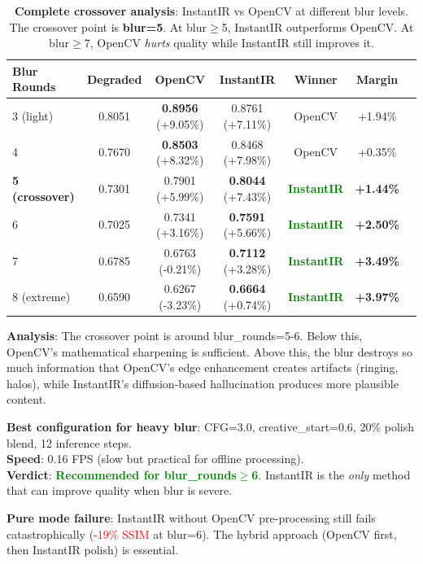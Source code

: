 \documentclass[11pt,a4paper]{article}
\begin{document}
\begin{table}[h]
\centering
\begin{tabular}{lcccccc}
\toprule
\textbf{Blur Rounds} & \textbf{Degraded} & \textbf{OpenCV} & \textbf{InstantIR} & \textbf{Winner} & \textbf{Margin} \\
\midrule
3 (light) & 0.8051 & \textbf{0.8956} (+9.05\%) & 0.8761 (+7.11\%) & OpenCV & +1.94\% \\
4 & 0.7670 & \textbf{0.8503} (+8.32\%) & 0.8468 (+7.98\%) & OpenCV & +0.35\% \\
\midrule
\textbf{5 (crossover)} & 0.7301 & 0.7901 (+5.99\%) & \textbf{0.8044} (+7.43\%) & \textcolor{green}{\textbf{InstantIR}} & \textbf{+1.44\%} \\
6 & 0.7025 & 0.7341 (+3.16\%) & \textbf{0.7591} (+5.66\%) & \textcolor{green}{\textbf{InstantIR}} & \textbf{+2.50\%} \\
7 & 0.6785 & 0.6763 (-0.21\%) & \textbf{0.7112} (+3.28\%) & \textcolor{green}{\textbf{InstantIR}} & \textbf{+3.49\%} \\
8 (extreme) & 0.6590 & 0.6267 (-3.23\%) & \textbf{0.6664} (+0.74\%) & \textcolor{green}{\textbf{InstantIR}} & \textbf{+3.97\%} \\
\bottomrule
\end{tabular}
\caption{\textbf{Complete crossover analysis}: InstantIR vs OpenCV at different blur levels. The crossover point is \textbf{blur=5}. At blur$\geq$5, InstantIR outperforms OpenCV. At blur$\geq$7, OpenCV \emph{hurts} quality while InstantIR still improves it.}
\label{tab:instantir-blur}
\end{table}

\textbf{Analysis}: The crossover point is around blur\_rounds=5-6. Below this, OpenCV's mathematical sharpening is sufficient. Above this, the blur destroys so much information that OpenCV's edge enhancement creates artifacts (ringing, halos), while InstantIR's diffusion-based hallucination produces more plausible content.

\textbf{Best configuration for heavy blur}: CFG=3.0, creative\_start=0.6, 20\% polish blend, 12 inference steps.\\
\textbf{Speed}: 0.16 FPS (slow but practical for offline processing).\\
\textbf{Verdict}: \textcolor{green}{\textbf{Recommended for blur\_rounds$\geq$6}}. InstantIR is the \emph{only} method that can improve quality when blur is severe.

\textbf{Pure mode failure}: InstantIR without OpenCV pre-processing still fails catastrophically (\textcolor{red}{-19\% SSIM} at blur=6). The hybrid approach (OpenCV first, then InstantIR polish) is essential.
\end{document}
